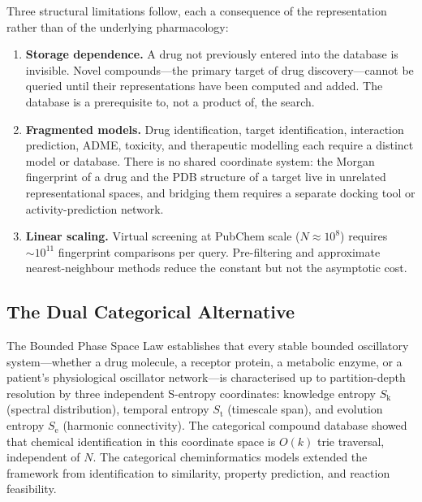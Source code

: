 \documentclass[11pt,twocolumn,a4paper]{article}
\theoremstyle{definition}
\theoremstyle{remark}
\newcommand{\Sk}{S_{\mathrm{k}}}
\newcommand{\St}{S_{\mathrm{t}}}
\newcommand{\Se}{S_{\mathrm{e}}}
\begin{document}
Three structural limitations follow, each a consequence of the representation rather than of the underlying pharmacology:

\begin{enumerate}[nosep,leftmargin=*]
\item \textbf{Storage dependence.} A drug not previously entered into the database is invisible. Novel compounds---the primary target of drug discovery---cannot be queried until their representations have been computed and added. The database is a prerequisite to, not a product of, the search.

\item \textbf{Fragmented models.} Drug identification, target identification, interaction prediction, ADME, toxicity, and therapeutic modelling each require a distinct model or database. There is no shared coordinate system: the Morgan fingerprint of a drug and the PDB structure of a target live in unrelated representational spaces, and bridging them requires a separate docking tool or activity-prediction network.

\item \textbf{Linear scaling.} Virtual screening at PubChem scale ($N \approx 10^8$) requires $\sim\!10^{11}$ fingerprint comparisons per query. Pre-filtering and approximate nearest-neighbour methods \citep{johnson2019} reduce the constant but not the asymptotic cost.
\end{enumerate}

\subsection{The Dual Categorical Alternative}

The Bounded Phase Space Law \citep{sachikonye2025a} establishes that every stable bounded oscillatory system---whether a drug molecule, a receptor protein, a metabolic enzyme, or a patient's physiological oscillator network---is characterised up to partition-depth resolution by three independent S-entropy coordinates: knowledge entropy $\Sk$ (spectral distribution), temporal entropy $\St$ (timescale span), and evolution entropy $\Se$ (harmonic connectivity). The categorical compound database \citep{sachikonye2025c} showed that chemical identification in this coordinate space is $O(k)$ trie traversal, independent of $N$. The categorical cheminformatics models \citep{sachikonye2025d} extended the framework from identification to similarity, property prediction, and reaction feasibility.
\end{document}

